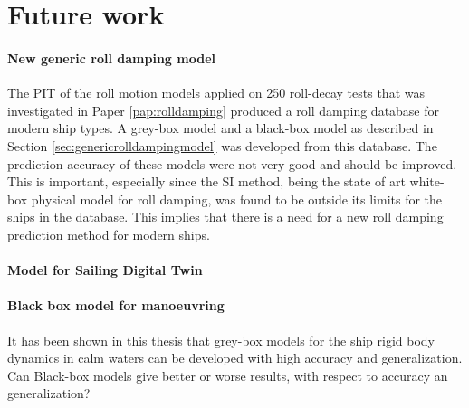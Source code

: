 \chapter{Future work\label{ch:future_work}}

\subsubsection*{New generic roll damping model}
The PIT of the roll motion models applied on 250 roll-decay tests that was investigated in Paper \ref{pap:rolldamping} produced a roll damping database for modern ship types. A grey-box model and a black-box model as described in Section \ref{sec:genericrolldampingmodel} was developed from this database. The prediction accuracy of these models were not very good and should be improved. This is important, especially since the SI method, being the state of art white-box physical model for roll damping, was found to be outside its limits for the ships in the database. This implies that there is a need for a new roll damping prediction method for modern ships.

\subsubsection*{Model for Sailing Digital Twin}

\subsubsection*{Black box model for manoeuvring}
It has been shown in this thesis that grey-box models for the ship rigid body dynamics in calm waters can be developed with high accuracy and generalization. Can Black-box models give better or worse results, with respect to accuracy an generalization?  